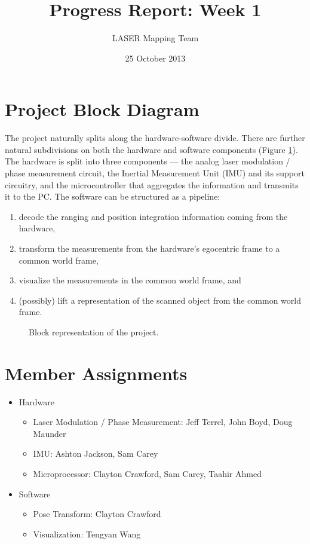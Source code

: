 \documentclass{article}
\title{Progress Report: Week 1}
\author{LASER Mapping Team}
\date{25 October 2013}
\begin{document}
\maketitle

\section{Project Block Diagram}

The project naturally splits along the hardware-software divide.  There are
further natural subdivisions on both the hardware and software components
(Figure \ref{fig:project-block-diagram}).  The hardware is split into three
components --- the analog laser modulation / phase measurement circuit, the
Inertial Measurement Unit (IMU) and its support circuitry, and the
microcontroller that aggregates the information and transmits it to the PC.  The
software can be structured as a pipeline:
\begin{enumerate}
\item decode the ranging and position integration information coming from the
  hardware,
\item transform the measurements from the hardware's egocentric frame to a
  common world frame,
\item visualize the measurements in the common world frame, and
\item (possibly) lift a representation of the scanned object from the common
  world frame.
\end{enumerate}

\begin{figure}
  
  \caption{Block representation of the project.}
  \label{fig:project-block-diagram}
\end{figure}

\section{Member Assignments}

\begin{itemize}
\item Hardware
  \begin{itemize}
  \item Laser Modulation / Phase Measurement: Jeff Terrel, John Boyd, Doug
    Maunder
  \item IMU: Ashton Jackson, Sam Carey
  \item Microprocessor: Clayton Crawford, Sam Carey, Taahir Ahmed
  \end{itemize}
\item Software
  \begin{itemize}
  \item Pose Transform: Clayton Crawford
  \item Visualization: Tengyan Wang
  \end{itemize}
\end{itemize}
\end{document}
